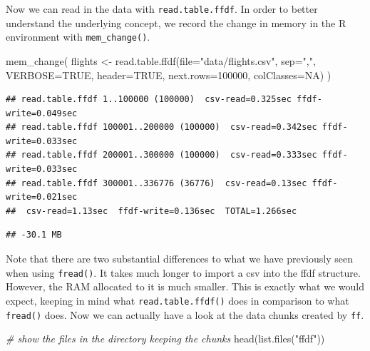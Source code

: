\documentclass[
  12pt,
]{style/krantz}
\newenvironment{Shaded}{\begin{snugshade}}{\end{snugshade}}
\newcommand{\AttributeTok}[1]{\textcolor[rgb]{0.77,0.63,0.00}{#1}}
\newcommand{\CommentTok}[1]{\textcolor[rgb]{0.56,0.35,0.01}{\textit{#1}}}
\newcommand{\ConstantTok}[1]{\textcolor[rgb]{0.00,0.00,0.00}{#1}}
\newcommand{\DecValTok}[1]{\textcolor[rgb]{0.00,0.00,0.81}{#1}}
\newcommand{\FunctionTok}[1]{\textcolor[rgb]{0.00,0.00,0.00}{#1}}
\newcommand{\NormalTok}[1]{#1}
\newcommand{\OtherTok}[1]{\textcolor[rgb]{0.56,0.35,0.01}{#1}}
\newcommand{\StringTok}[1]{\textcolor[rgb]{0.31,0.60,0.02}{#1}}
\begin{document}
Now we can read in the data with \texttt{read.table.ffdf}. In order to better understand the underlying concept, we record the change in memory in the R environment with \texttt{mem\_change()}.

\begin{Shaded}
\begin{Highlighting}[]
\FunctionTok{mem\_change}\NormalTok{(}
\NormalTok{flights }\OtherTok{\textless{}{-}} 
     \FunctionTok{read.table.ffdf}\NormalTok{(}\AttributeTok{file=}\StringTok{"data/flights.csv"}\NormalTok{,}
                     \AttributeTok{sep=}\StringTok{","}\NormalTok{,}
                     \AttributeTok{VERBOSE=}\ConstantTok{TRUE}\NormalTok{,}
                     \AttributeTok{header=}\ConstantTok{TRUE}\NormalTok{,}
                     \AttributeTok{next.rows=}\DecValTok{100000}\NormalTok{,}
                     \AttributeTok{colClasses=}\ConstantTok{NA}\NormalTok{)}
\NormalTok{)}
\end{Highlighting}
\end{Shaded}

\begin{verbatim}
## read.table.ffdf 1..100000 (100000)  csv-read=0.325sec ffdf-write=0.049sec
## read.table.ffdf 100001..200000 (100000)  csv-read=0.342sec ffdf-write=0.033sec
## read.table.ffdf 200001..300000 (100000)  csv-read=0.333sec ffdf-write=0.033sec
## read.table.ffdf 300001..336776 (36776)  csv-read=0.13sec ffdf-write=0.021sec
##  csv-read=1.13sec  ffdf-write=0.136sec  TOTAL=1.266sec
\end{verbatim}

\begin{verbatim}
## -30.1 MB
\end{verbatim}

Note that there are two substantial differences to what we have previously seen when using \texttt{fread()}. It takes much longer to import a csv into the ffdf structure. However, the RAM allocated to it is much smaller. This is exactly what we would expect, keeping in mind what \texttt{read.table.ffdf()} does in comparison to what \texttt{fread()} does. Now we can actually have a look at the data chunks created by \texttt{ff}.

\begin{Shaded}
\begin{Highlighting}[]
\CommentTok{\# show the files in the directory keeping the chunks}
\FunctionTok{head}\NormalTok{(}\FunctionTok{list.files}\NormalTok{(}\StringTok{"ffdf"}\NormalTok{))}
\end{Highlighting}
\end{Shaded}
\end{document}
